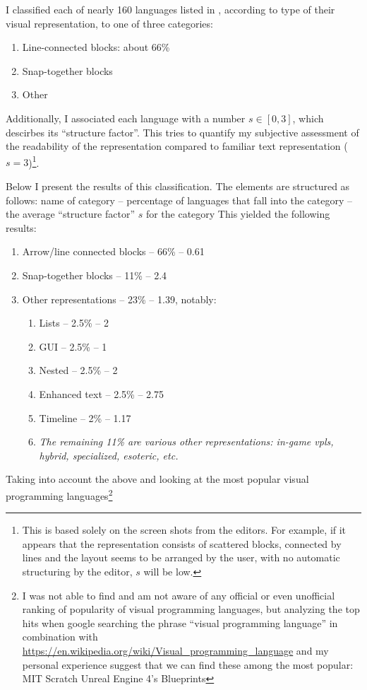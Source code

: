 I classified each of nearly 160 languages listed in \cite{snapshots}, according to type of their visual representation, to one of three categories:
\begin{enumerate}
    \item Line-connected blocks: about 66\%
    \item Snap-together blocks
    \item Other
\end{enumerate}

Additionally, I associated each language with a number $s \in [0, 3]$, which descirbes its ``structure factor''. This tries to quantify my subjective assessment of the readability of the representation compared to familiar text representation ($s = 3$)\footnote{This is based solely on the screen shots from the editors. For example, if it appears that the representation consists of scattered blocks, connected by lines and the layout seems to be arranged by the user, with no automatic structuring by the editor, $s$ will be low.}.

Below I present the results of this classification. The elements are structured as follows: name of category -- percentage of languages that fall into the category -- the average ``structure factor'' $s$ for the category
This yielded the following results:
\begin{enumerate}
    \item Arrow/line connected blocks -- 66\% -- 0.61
    \item Snap-together blocks -- 11\% -- 2.4
    \item Other representations -- 23\% -- 1.39, notably:
    \begin{enumerate}
        \item Lists -- 2.5\% -- 2
        \item GUI -- 2.5\% -- 1
        \item Nested -- 2.5\% -- 2
        \item Enhanced text -- 2.5\% -- 2.75
        \item Timeline -- 2\% -- 1.17
        \item \textit{The remaining 11\% are various other representations: in-game \acrshort{vpl}s, hybrid, specialized, esoteric, etc.}
    \end{enumerate}
\end{enumerate}

Taking into account the above and looking at the most popular visual programming languages\footnote{I was not able to find and am not aware of any official or even unofficial ranking of popularity of visual programming languages, but analyzing the top hits when google searching the phrase ``visual programming language'' in combination with \url{https://en.wikipedia.org/wiki/Visual_programming_language} and my personal experience suggest that we can find these among the most popular:
MIT Scratch
Unreal Engine 4's Blueprints}

